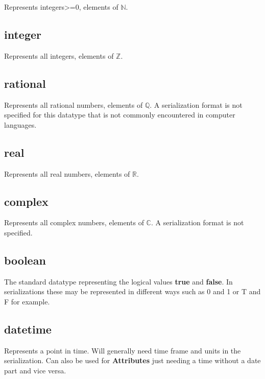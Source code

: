 \documentclass[10pt,a4paper]{ivoa}
\begin{document}
Represents integers\textgreater=0, elements of \(\mathbb{N}\).

\hypertarget{integer}{%
\subsection{integer}\label{integer}}

Represents all integers, elements of \(\mathbb{Z}\).

\hypertarget{rational}{%
\subsection{rational}\label{rational}}

Represents all rational numbers, elements of \(\mathbb{Q.}\) A
serialization format is not specified for this datatype that is not
commonly encountered in computer languages.

\hypertarget{real}{%
\subsection{real}\label{real}}

Represents all real numbers, elements of \(\mathbb{R}\).

\hypertarget{complex}{%
\subsection{complex}\label{complex}}

Represents all complex numbers, elements of \(\mathbb{C.}\) A
serialization format is not specified.

\hypertarget{boolean}{%
\subsection{boolean}\label{boolean}}

The standard datatype representing the logical values \textbf{true} and
\textbf{false}. In serializations these may be represented in different
ways such as 0 and 1 or T and F for example.

\hypertarget{datetime}{%
\subsection{datetime}\label{datetime}}

Represents a point in time. Will generally need time frame and units in
the serialization. Can also be used for \textbf{Attributes} just needing
a time without a date part and vice versa.
\end{document}
